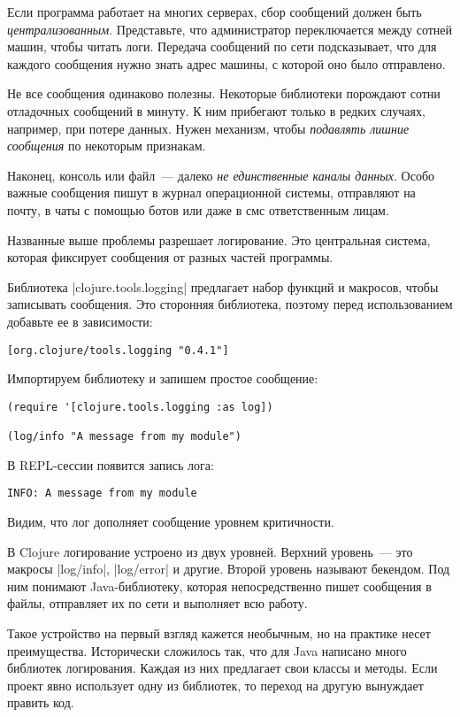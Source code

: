 Если программа работает на многих серверах, сбор сообщений должен быть
\emph{централизованным}. Представьте, что администратор переключается между сотней
машин, чтобы читать логи. Передача сообщений по сети подсказывает, что для
каждого сообщения нужно знать адрес машины, с которой оно было отправлено.

Не все сообщения одинаково полезны. Некоторые библиотеки порождают сотни
отладочных сообщений в минуту. К ним прибегают только в редких случаях,
например, при потере данных. Нужен механизм, чтобы \emph{подавлять лишние
сообщения} по некоторым признакам.

Наконец, консоль или файл~--- далеко \emph{не единственные каналы данных}. Особо
важные сообщения пишут в журнал операционной системы, отправляют на почту, в
чаты с помощью ботов или даже в смс ответственным лицам.

Названные выше проблемы разрешает логирование. Это центральная система, которая
фиксирует сообщения от разных частей программы.

Библиотека \spverb|clojure.tools.logging| предлагает набор функций и макросов, чтобы
записывать сообщения. Это сторонняя библиотека, поэтому перед использованием
добавьте ее в зависимости:

\begin{verbatim}
[org.clojure/tools.logging "0.4.1"]
\end{verbatim}

Импортируем библиотеку и запишем простое сообщение:

\begin{verbatim}
(require '[clojure.tools.logging :as log])

(log/info "A message from my module")
\end{verbatim}

В REPL-сессии появится запись лога:

\begin{verbatim}
INFO: A message from my module
\end{verbatim}

Видим, что лог дополняет сообщение уровнем критичности.

В Clojure логирование устроено из двух уровней. Верхний уровень~--- это макросы
\spverb|log/info|, \spverb|log/error| и другие. Второй уровень называют бекендом. Под ним
понимают Java-библиотеку, которая непосредственно пишет сообщения в файлы,
отправляет их по сети и выполняет всю работу.

Такое устройство на первый взгляд кажется необычным, но на практике несет
преимущества. Исторически сложилось так, что для Java написано много библиотек
логирования. Каждая из них предлагает свои классы и методы. Если проект явно
использует одну из библиотек, то переход на другую вынуждает править код.

